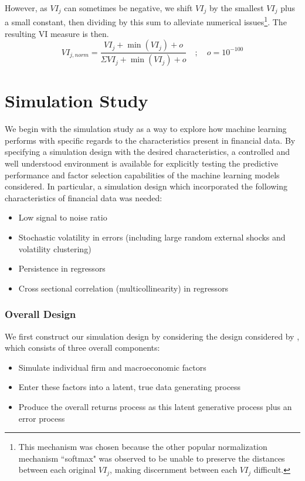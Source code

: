 \documentclass{article}
\begin{document}
However, as $VI_j$ can sometimes be negative, we shift $VI_j$ by the smallest $VI_j$ plus a small constant, then dividing by this sum to alleviate numerical issues\footnote{This mechanism was chosen because the other popular normalization mechanism ``softmax" was observed to be unable to preserve the distances between each original $VI_j$, making discernment between each $VI_j$ difficult.}. The resulting VI measure is then. 
\begin{equation}
VI_{j, norm} = \frac{VI_j + \operatorname{min}(VI_j) + o}
{\Sigma VI_j + \operatorname{min}(VI_j) + o} \quad ; \quad o = 10^{-100}
\end{equation}


\section{Simulation Study}

We begin with the simulation study as a way to explore how machine learning performs with specific regards to the characteristics present in financial data. By specifying a simulation design with the desired characteristics, a controlled and well understood environment is available for explicitly testing the predictive performance and factor selection capabilities of the machine learning models considered. In particular, a simulation design which incorporated the following characteristics of financial data was needed:

\begin{itemize}
	\item Low signal to noise ratio
	\item Stochastic volatility in errors (including large random external shocks and volatility clustering)
	\item Persistence in regressors
	\item Cross sectional correlation (multicollinearity) in regressors
\end{itemize}

\subsubsection{Overall Design}

We first construct our simulation design by considering the design considered by \cite{gu_empirical_2018}, which consists of three overall components:
\begin{itemize}
	\item Simulate individual firm and macroeconomic factors
	\item Enter these factors into a latent, true data generating process
	\item Produce the overall returns process as this latent generative process plus an error process
\end{itemize}
\end{document}

